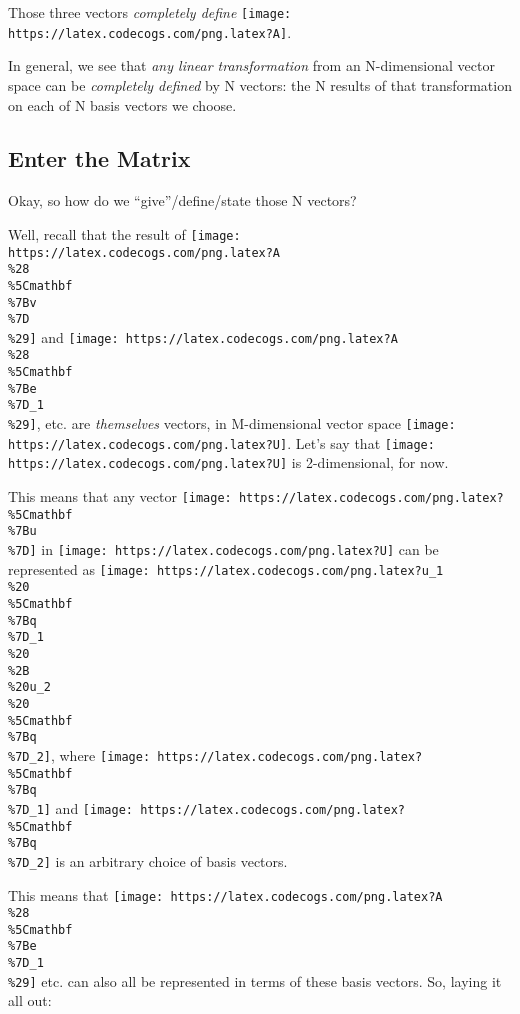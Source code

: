 \documentclass[]{article}
\begin{document}
Those three vectors \emph{completely define}
\texttt{[image: https://latex.codecogs.com/png.latex?A]}.

In general, we see that \emph{any linear transformation} from an N-dimensional
vector space can be \emph{completely defined} by N vectors: the N results of
that transformation on each of N basis vectors we choose.

\hypertarget{enter-the-matrix}{%
\subsection{Enter the Matrix}\label{enter-the-matrix}}

Okay, so how do we ``give''/define/state those N vectors?

Well, recall that the result of
\texttt{[image: https://latex.codecogs.com/png.latex?A\\\%28\\\%5Cmathbf\\\%7Bv\\\%7D\\\%29]}
and
\texttt{[image: https://latex.codecogs.com/png.latex?A\\\%28\\\%5Cmathbf\\\%7Be\\\%7D\_1\\\%29]},
etc. are \emph{themselves} vectors, in M-dimensional vector space
\texttt{[image: https://latex.codecogs.com/png.latex?U]}. Let's say that
\texttt{[image: https://latex.codecogs.com/png.latex?U]} is 2-dimensional, for
now.

This means that any vector
\texttt{[image: https://latex.codecogs.com/png.latex?\\\%5Cmathbf\\\%7Bu\\\%7D]} in
\texttt{[image: https://latex.codecogs.com/png.latex?U]} can be represented as
\texttt{[image: https://latex.codecogs.com/png.latex?u\_1\\\%20\\\%5Cmathbf\\\%7Bq\\\%7D\_1\\\%20\\\%2B\\\%20u\_2\\\%20\\\%5Cmathbf\\\%7Bq\\\%7D\_2]},
where
\texttt{[image: https://latex.codecogs.com/png.latex?\\\%5Cmathbf\\\%7Bq\\\%7D\_1]} and
\texttt{[image: https://latex.codecogs.com/png.latex?\\\%5Cmathbf\\\%7Bq\\\%7D\_2]} is
an arbitrary choice of basis vectors.

This means that
\texttt{[image: https://latex.codecogs.com/png.latex?A\\\%28\\\%5Cmathbf\\\%7Be\\\%7D\_1\\\%29]}
etc. can also all be represented in terms of these basis vectors. So, laying it
all out:
\end{document}
